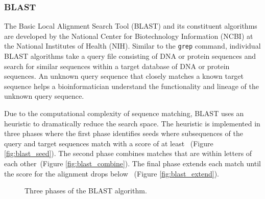 \documentclass[conference,compsoc]{IEEEtran}
\begin{document}
\subsubsection{BLAST}

The Basic Local Alignment Search Tool (BLAST)\cite{BLAST} and its constituent algorithms are developed by the National Center for Biotechnology Information (NCBI) at the National Institutes of Health (NIH). Similar to the {\tt grep} command, individual BLAST algorithms take a query file consisting of DNA or protein sequences and search for similar sequences within a target database of DNA or protein sequences. An unknown query sequence that closely matches a known target sequence helps a bioinformatician understand the functionality and lineage of the unknown query sequence.



Due to the computational complexity of sequence matching, BLAST uses an heuristic to dramatically reduce the search space. The heuristic is implemented in three phases where the first phase identifies seeds where subsequences of the query and target sequences match with a score of at least ~(Figure \ref{fig:blast_seed}). The second phase combines matches that are within  letters of each other~(Figure \ref{fig:blast_combine}). The final phase extends each match until the score for the alignment drops below ~(Figure \ref{fig:blast_extend}).


\begin{figure*}[!t]
\centering
{}
\hfil
{}
\hfil
{}
\caption{Three phases of the BLAST algorithm.}
\label{fig:blast_phases}
\end{figure*}
\end{document}

